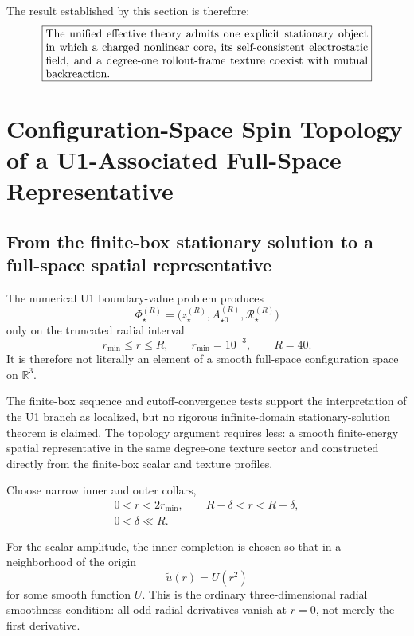 \documentclass[11pt]{article}
\begin{document}
The result established by this section is therefore:
\begin{equation}
\boxed{
\begin{minipage}{0.84\linewidth}
The unified effective theory admits one explicit stationary object in which a charged nonlinear core, its self-consistent electrostatic field, and a degree-one rollout-frame texture coexist with mutual backreaction.
\end{minipage}
}
\end{equation}

\section{Configuration-Space Spin Topology of a U1-Associated Full-Space Representative}

\subsection{From the finite-box stationary solution to a full-space spatial representative}

The numerical U1 boundary-value problem produces
\begin{equation}
\Phi_\star^{(R)}
=
\bigl(
z_\star^{(R)},
A_{\star0}^{(R)},
\mathcal R_\star^{(R)}
\bigr)
\end{equation}
only on the truncated radial interval
\begin{equation}
r_{\min}\le r\le R,
\qquad
r_{\min}=10^{-3},
\qquad
R=40.
\end{equation}
It is therefore not literally an element of a smooth full-space configuration space on \(\mathbb R^3\).

The finite-box sequence and cutoff-convergence tests support the interpretation of the U1 branch as localized, but no rigorous infinite-domain stationary-solution theorem is claimed. The topology argument requires less: a smooth finite-energy spatial representative in the same degree-one texture sector and constructed directly from the finite-box scalar and texture profiles.

Choose narrow inner and outer collars,
\begin{equation}
\begin{gathered}
0<r<2r_{\min},
\qquad
R-\delta<r<R+\delta,
\\
0<\delta\ll R.
\end{gathered}
\end{equation}

For the scalar amplitude, the inner completion is chosen so that in a neighborhood of the origin
\begin{equation}
\boxed{
\widetilde u(r)=U(r^2)
}
\end{equation}
for some smooth function \(U\). This is the ordinary three-dimensional radial smoothness condition: all odd radial derivatives vanish at \(r=0\), not merely the first derivative.
\end{document}
